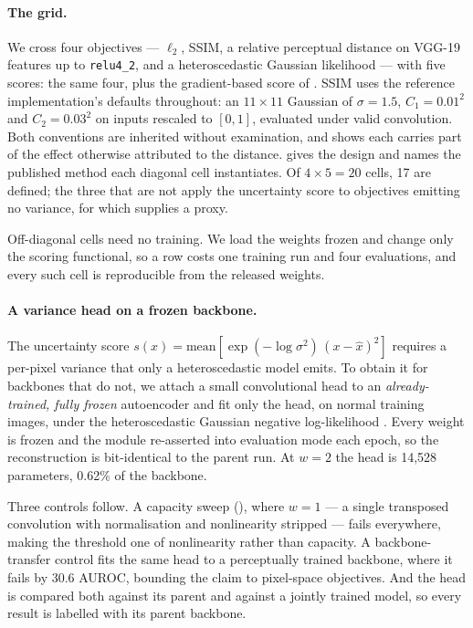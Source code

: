 \documentclass[pmlr,twocolumn,10pt]{jmlr} %
\begin{document}
\paragraph*{The grid.}
We cross four objectives --- $\ell_2$, SSIM, a relative perceptual distance on VGG-19
features up to \texttt{relu4\_2}, and a heteroscedastic Gaussian likelihood --- with five
scores: the same four, plus the gradient-based score of \citet{zimmerer2019unsupervised}.
SSIM uses the reference implementation's defaults throughout: an $11\times11$ Gaussian of
$\sigma{=}1.5$, $C_1{=}0.01^2$ and $C_2{=}0.03^2$ on inputs rescaled to $[0,1]$, evaluated
under valid convolution. Both conventions are inherited without examination, and  shows each
carries part of the effect otherwise attributed to the distance.  gives the design and names the published method each diagonal
cell instantiates. Of $4\times5=20$ cells, 17 are defined; the three that are not apply the
uncertainty score to objectives emitting no variance, for which 
supplies a proxy.

Off-diagonal cells need no training. We load the weights frozen and change only the
scoring functional, so a row costs one training run and four evaluations, and every such
cell is reproducible from the released weights.

\paragraph*{A variance head on a frozen backbone.}
\label{sec:probe}
The uncertainty score $s(x) = \mathrm{mean}[\exp(-\log\sigma^2)\,(x-\hat{x})^2]$ requires a
per-pixel variance that only a heteroscedastic model emits. To obtain it for backbones that do not, we attach a small convolutional head to an
\emph{already-trained, fully frozen} autoencoder and fit only the head, on normal training
images, under the heteroscedastic Gaussian negative log-likelihood
\citep{nix1994estimating,kendall2017uncertainties}. Every weight is frozen and the module
re-asserted into evaluation mode each epoch, so the reconstruction is bit-identical to the
parent run. At $w{=}2$ the head is 14{,}528 parameters, 0.62\% of the backbone.

Three controls follow. A capacity sweep (), where $w{=}1$ --- a
single transposed convolution with normalisation and nonlinearity stripped --- fails
everywhere, making the threshold one of nonlinearity rather than capacity. A
backbone-transfer control fits the same head to a perceptually trained backbone, where it
fails by 30.6 AUROC, bounding the claim to pixel-space objectives. And the head is compared
both against its parent and against a jointly trained model, so every result is labelled
with its parent backbone.
\end{document}
